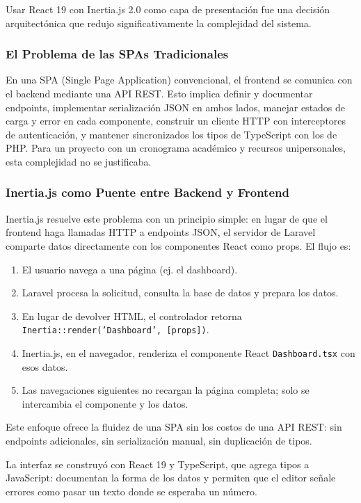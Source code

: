 Usar React 19 con Inertia.js 2.0 como capa de presentación fue una decisión arquitectónica que redujo significativamente la complejidad del sistema.

\subsubsection{El Problema de las SPAs Tradicionales}

En una SPA (Single Page Application) convencional, el frontend se comunica con el backend mediante una API REST. Esto implica definir y documentar endpoints, implementar serialización JSON en ambos lados, manejar estados de carga y error en cada componente, construir un cliente HTTP con interceptores de autenticación, y mantener sincronizados los tipos de TypeScript con los de PHP. Para un proyecto con un cronograma académico y recursos unipersonales, esta complejidad no se justificaba.

\subsubsection{Inertia.js como Puente entre Backend y Frontend}

Inertia.js resuelve este problema con un principio simple: en lugar de que el frontend haga llamadas HTTP a endpoints JSON, el servidor de Laravel comparte datos directamente con los componentes React como props. El flujo es:

\begin{enumerate}
    \item El usuario navega a una página (ej. el dashboard).
    \item Laravel procesa la solicitud, consulta la base de datos y prepara los datos.
    \item En lugar de devolver HTML, el controlador retorna \texttt{Inertia::render('Dashboard', [props])}.
    \item Inertia.js, en el navegador, renderiza el componente React \texttt{Dashboard.tsx} con esos datos.
    \item Las navegaciones siguientes no recargan la página completa; solo se intercambia el componente y los datos.
\end{enumerate}

Este enfoque ofrece la fluidez de una SPA sin los costos de una API REST: sin endpoints adicionales, sin serialización manual, sin duplicación de tipos.

La interfaz se construyó con React 19 y TypeScript, que agrega tipos a JavaScript: documentan la forma de los datos y permiten que el editor señale errores como pasar un texto donde se esperaba un número.

